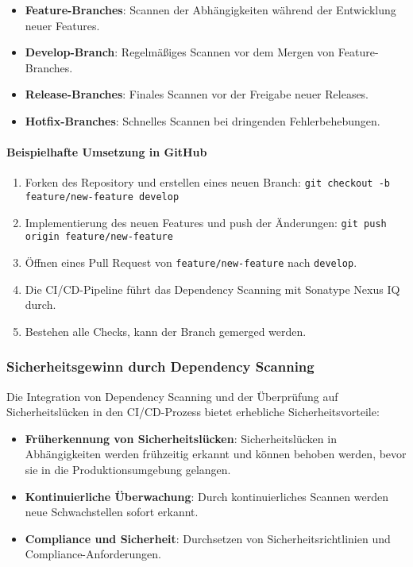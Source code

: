 \begin{itemize}
    \item \textbf{Feature-Branches}: Scannen der Abhängigkeiten während der Entwicklung neuer Features.
    \item \textbf{Develop-Branch}: Regelmäßiges Scannen vor dem Mergen von Feature-Branches.
    \item \textbf{Release-Branches}: Finales Scannen vor der Freigabe neuer Releases.
    \item \textbf{Hotfix-Branches}: Schnelles Scannen bei dringenden Fehlerbehebungen.
\end{itemize}

\paragraph{Beispielhafte Umsetzung in GitHub}

\begin{enumerate}
    \item Forken des Repository und erstellen eines neuen Branch: \texttt{git checkout -b feature/new-feature develop}
    \item Implementierung des neuen Features und push der Änderungen: \texttt{git push origin feature/new-feature}
    \item Öffnen eines Pull Request von \texttt{feature/new-feature} nach \texttt{develop}.
    \item Die CI/CD-Pipeline führt das Dependency Scanning mit Sonatype Nexus IQ durch.
    \item Bestehen alle Checks, kann der Branch gemerged werden.
\end{enumerate}

\subsubsection{Sicherheitsgewinn durch Dependency Scanning}

Die Integration von Dependency Scanning und der Überprüfung auf Sicherheitslücken in den CI/CD-Prozess bietet erhebliche Sicherheitsvorteile:

\begin{itemize}
    \item \textbf{Früherkennung von Sicherheitslücken}: Sicherheitslücken in Abhängigkeiten werden frühzeitig erkannt und können behoben werden, bevor sie in die Produktionsumgebung gelangen.
    \item \textbf{Kontinuierliche Überwachung}: Durch kontinuierliches Scannen werden neue Schwachstellen sofort erkannt.
    \item \textbf{Compliance und Sicherheit}: Durchsetzen von Sicherheitsrichtlinien und Compliance-Anforderungen.
\end{itemize}

